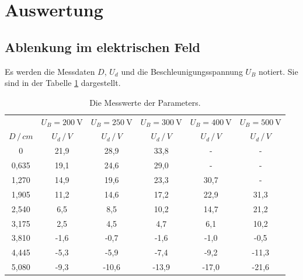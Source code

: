 \section{Auswertung}
\subsection{Ablenkung im elektrischen Feld}
Es werden die Messdaten $D$, $U_d$ und die Beschleunigungsspannung $U_B$ notiert.
Sie sind in der Tabelle \ref{tab:1} dargestellt.

\begin{table}[H]
  \centering
  \caption{Die Messwerte der Parameters.}
  \label{tab:1}
  \begin{tabular}{c c c c c c}
\toprule
& \multicolumn{1}{c}{$U_B=\SI{200}{\volt}$} & \multicolumn{1}{c}{$U_B=\SI{250}{\volt}$} &\multicolumn{1}{c}{$U_B=\SI{300}{\volt}$}&\multicolumn{1}{c}{$U_B=\SI{400}{\volt}$}&\multicolumn{1}{c}{$U_B=\SI{500}{\volt}$}\\
\cmidrule(lr){2-2}\cmidrule(lr){3-3}\cmidrule(lr){4-4}\cmidrule(lr){5-5}\cmidrule(lr){6-6}
$D \, / \, cm$ & $U_d \, / \, V$ & $U_d \, / \, V$ & $U_d \, / \, V$ &$U_d \, / \, V$ & $U_d \, / \, V$\\
\midrule
0     & 21,9  & 28,9  & 33,8  & -    & -   \\
0,635 & 19,1  & 24,6  & 29,0  & -    & -   \\
1,270 & 14,9  & 19,6  & 23,3  & 30,7 & -   \\
1,905 & 11,2  & 14,6  & 17,2  & 22,9 & 31,3\\
2,540 &  6,5  &  8,5  & 10,2  & 14,7 & 21,2\\
3,175 &  2,5  &  4,5  &  4,7  &  6,1 & 10,2\\
3,810 & -1,6  & -0,7  & -1,6  & -1,0 & -0,5\\
4,445 & -5,3  & -5,9  & -7,4  & -9,2 &-11,3\\
5,080 & -9,3  &-10,6  &-13,9  &-17,0 &-21,6\\
\bottomrule
  \end{tabular}
\end{table}



